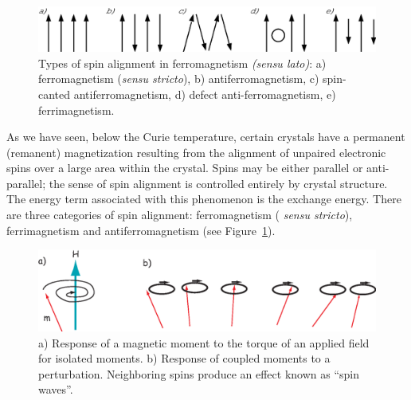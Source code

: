 {\begin{figure}[h!tb]
\centering  \includegraphics[width=14 cm]{EPSfiles/spins.eps}
\caption{Types of spin alignment in ferromagnetism {\it (sensu lato)}:
a) ferromagnetism ({\it sensu stricto}), b) antiferromagnetism, c)
spin-canted antiferromagnetism, d) defect anti-ferromagnetism, e)
ferrimagnetism.
}
\label{fig:spins}
\end{figure}



%

As we have seen,
below the Curie temperature, certain crystals have a permanent
(remanent) magnetization resulting from the alignment of unpaired
electronic spins over a large area within the crystal.  Spins may be
 either parallel or anti-parallel;
the sense of spin alignment is controlled
entirely by crystal structure. The energy term associated with this
phenomenon is the 
%
{exchange energy}. 
%
%
%
 There are three categories of spin alignment: ferromagnetism ({\it
sensu stricto}),  ferrimagnetism and antiferromagnetism (see
Figure~\ref{fig:spins}).  

 \begin{figure}[htb]
 \centering  \includegraphics[width=14 cm]{EPSfiles/spinwave.eps}
 \caption{a) Response of a magnetic moment to the torque of an applied field for isolated moments.  b) Response of coupled moments to a perturbation. Neighboring spins produce an effect known as ``spin waves''.}
 \label{fig:spinwave}
 \end{figure}
 


}
